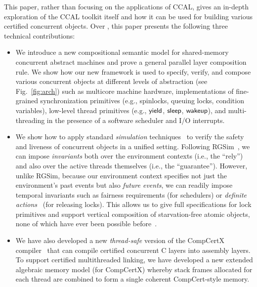 This paper, rather than focusing on the applications of  CCAL, gives an in-depth exploration of the CCAL toolkit itself and how it can be used for building various certified concurrent objects. Over \citet{certikos-osdi16}, this paper presents the following three  technical contributions:
\begin{itemize}[leftmargin=15pt] \itemsep1em

\item We introduce a new compositional semantic model for shared-memory
  concurrent abstract machines and prove a general parallel layer
  composition rule. We show how our new framework is
  used to specify, verify, and compose various concurrent objects at different levels of abstraction (see Fig.~\ref{fig:arch}) 
  such as multicore
  machine hardware, implementations of fine-grained
  synchronization primitives (e.g., spinlocks, queuing locks,
  condition variables), low-level thread primitives (e.g., $\mathsf{yield}$,
  $\mathsf{sleep}$, $\mathsf{wakeup}$), and multi-threading in the presence of a software 
  scheduler and I/O interrupts.
\item We show how to apply standard {\em simulation}
  techniques~\cite{compcert,dscal15} to verify
  the safety and liveness of concurrent objects in a unified setting.
Following RGSim~\cite{RGSim}, we can impose
  {\em invariants} both over the environment contexts (i.e., the ``rely'')
  and also over the active threads themselves (i.e., the ``guarantee'').
  However, unlike RGSim,
  because our environment context
  specifies not just the environment's past events
  but also {\em future events}, we can readily impose temporal
  invariants such as fairness requirements (for schedulers) or
  {\em definite actions}~\cite{lili16} (for releasing locks). This allows
  us to give full specifications for lock primitives and support vertical
  composition of starvation-free atomic objects, none of which have ever
  been possible before~\cite{lili16}.
\item
  We have also developed a new {\em thread-safe} version of the
  CompCertX compiler~\cite{dscal15} that can compile certified concurrent C
  layers into assembly layers.
  To support certified multithreaded linking, we have developed a new
   extended algebraic memory model (for CompCertX) whereby stack frames
  allocated for each thread are combined to form a single coherent
  CompCert-style memory.
\end{itemize}
%
